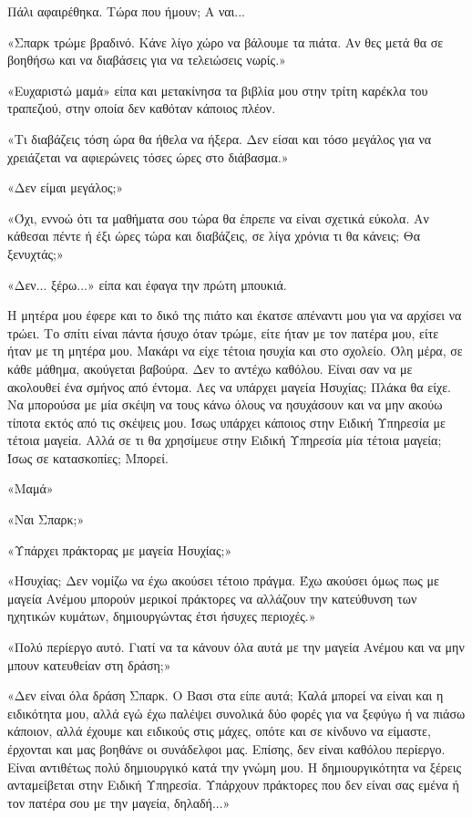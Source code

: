 \documentclass[12pt,twoside, openany]{book}
\begin{document}
Πάλι αφαιρέθηκα. Τώρα που ήμουν; Α ναι...

«Σπαρκ τρώμε βραδινό. Κάνε λίγο χώρο να βάλουμε τα πιάτα. Αν θες μετά θα σε βοηθήσω και να διαβάσεις για να τελειώσεις νωρίς.»

«Ευχαριστώ μαμά» είπα και μετακίνησα τα βιβλία μου στην τρίτη καρέκλα του τραπεζιού, στην οποία δεν καθόταν κάποιος πλέον. 

«Τι διαβάζεις τόση ώρα θα ήθελα να ήξερα. Δεν είσαι και τόσο μεγάλος για να χρειάζεται να αφιερώνεις τόσες ώρες στο διάβασμα.»

«Δεν είμαι μεγάλος;»

«Όχι, εννοώ ότι τα μαθήματα σου τώρα θα έπρεπε να είναι σχετικά εύκολα. Αν κάθεσαι πέντε ή έξι ώρες τώρα και διαβάζεις, σε λίγα χρόνια τι θα κάνεις; Θα ξενυχτάς;»

«Δεν... ξέρω...» είπα και έφαγα την πρώτη μπουκιά.

Η μητέρα μου έφερε και το δικό της πιάτο και έκατσε απέναντι μου για να αρχίσει να τρώει. Το σπίτι είναι πάντα ήσυχο όταν τρώμε, είτε ήταν με τον πατέρα μου, είτε ήταν με τη μητέρα μου. Μακάρι να είχε τέτοια ησυχία και στο σχολείο. Όλη μέρα, σε κάθε μάθημα, ακούγεται βαβούρα. Δεν το αντέχω καθόλου. Είναι σαν να με ακολουθεί ένα σμήνος από έντομα. Λες να υπάρχει μαγεία Ησυχίας; Πλάκα θα είχε. Να μπορούσα με μία σκέψη να τους κάνω όλους να ησυχάσουν και να μην ακούω τίποτα εκτός από τις σκέψεις μου. Ίσως υπάρχει κάποιος στην Ειδική Υπηρεσία με τέτοια μαγεία. Αλλά σε τι θα χρησίμευε στην Ειδική Υπηρεσία μία τέτοια μαγεία; Ίσως σε κατασκοπίες; Μπορεί.

«Μαμά»

«Ναι Σπαρκ;»

«Υπάρχει πράκτορας με μαγεία Ησυχίας;»

«Ησυχίας; Δεν νομίζω να έχω ακούσει τέτοιο πράγμα. Έχω ακούσει όμως πως με μαγεία Ανέμου μπορούν μερικοί πράκτορες να αλλάζουν την κατεύθυνση των ηχητικών κυμάτων, δημιουργώντας έτσι ήσυχες περιοχές.»

«Πολύ περίεργο αυτό. Γιατί να τα κάνουν όλα αυτά με την μαγεία Ανέμου και να μην μπουν κατευθείαν στη δράση;»

«Δεν είναι όλα δράση Σπαρκ. Ο Βασι στα είπε αυτά; Καλά μπορεί να είναι και η ειδικότητα μου, αλλά εγώ έχω παλέψει συνολικά δύο φορές για να ξεφύγω ή να πιάσω κάποιον, αλλά έχουμε και ειδικούς στις μάχες, οπότε και σε κίνδυνο να είμαστε, έρχονται και μας βοηθάνε οι συνάδελφοι μας. Επίσης, δεν είναι καθόλου περίεργο. Είναι αντιθέτως πολύ δημιουργικό κατά την γνώμη μου. Η δημιουργικότητα να ξέρεις ανταμείβεται στην Ειδική Υπηρεσία. Υπάρχουν πράκτορες που δεν είναι σας εμένα ή τον πατέρα σου με την μαγεία, δηλαδή...»
\end{document}
